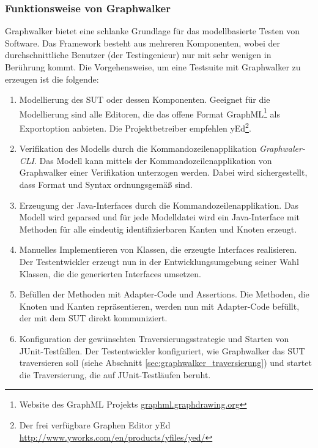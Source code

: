 \subsubsection{Funktionsweise von Graphwalker}
\label{sec:graphwalker_funktionsweise}
Graphwalker bietet eine schlanke Grundlage für das modellbasierte Testen von Software. Das Framework besteht aus mehreren Komponenten, wobei der durchschnittliche Benutzer (der Testingenieur) nur mit sehr wenigen in Berührung kommt. Die Vorgehensweise, um eine Testsuite mit Graphwalker zu erzeugen ist die folgende:

\begin{enumerate}
\item Modellierung des \Gls{SUT} oder dessen Komponenten. Geeignet für die Modellierung sind alle Editoren, die das offene Format GraphML\footnote{Website des GraphML Projekts \url{graphml.graphdrawing.org}} als Exportoption anbieten. Die Projektbetreiber empfehlen yEd\footnote{Der frei verfügbare Graphen Editor yEd \url{http://www.yworks.com/en/products/yfiles/yed/}}.
\item Verifikation des Modells durch die Kommandozeilenapplikation \textit{Graphwaler-CLI}. Das Modell kann mittels der Kommandozeilenapplikation von Graphwalker einer Verifikation unterzogen werden. Dabei wird sichergestellt, dass Format und Syntax ordnungsgemäß sind.
\item Erzeugung der Java-Interfaces durch die Kommandozeilenapplikation. Das Modell wird geparsed und für jede Modelldatei wird ein Java-Interface mit Methoden für alle eindeutig identifizierbaren Kanten und Knoten erzeugt.
\item Manuelles Implementieren von Klassen, die erzeugte Interfaces realisieren. Der Testentwickler erzeugt nun in der Entwicklungsumgebung seiner Wahl Klassen, die die generierten Interfaces umsetzen.
\item Befüllen der Methoden mit Adapter-Code und Assertions. Die Methoden, die Knoten und Kanten repräsentieren, werden nun mit Adapter-Code befüllt, der mit dem \Gls{SUT} direkt kommuniziert.
\item Konfiguration der gewünschten Traversierungsstrategie und Starten von JUnit-Testfällen. Der Testentwickler konfiguriert, wie Graphwalker das \Gls{SUT} traversieren soll (siehe Abschnitt \ref{sec:graphwalker_traversierung}) und startet die Traversierung, die auf JUnit-Testläufen beruht.
\end{enumerate}


